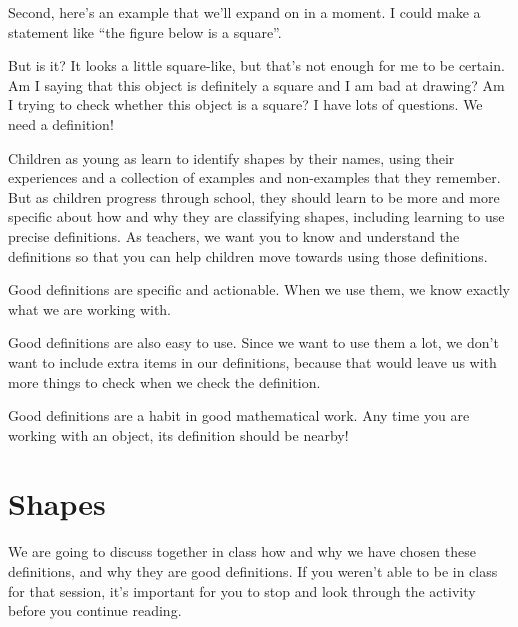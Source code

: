 \documentclass{ximera}
\begin{document}
Second, here's an example that we'll expand on in a moment. I could make a statement like ``the figure below is a square''.
\begin{image}
\end{image}
But is it? It looks a little square-like, but that's not enough for me to be certain. Am I saying that this object is definitely a square and I am bad at drawing? Am I trying to check whether this object is a square? I have lots of questions. We need a definition!

Children as young as  learn to identify shapes by their names, using their experiences and a collection of examples and non-examples that they remember. But as children progress through school, they should learn to be more and more specific about how and why they are classifying shapes, including learning to use precise definitions. As teachers, we want you to know and understand the definitions so that you can help children move towards using those definitions.

Good definitions are specific and actionable. When we use them, we know exactly what we are working with.

Good definitions are also easy to use. Since we want to use them a lot, we don't want to include extra items in our definitions, because that would leave us with more things to check when we check the definition.

Good definitions are a habit in good mathematical work. Any time you are working with an object, its definition should be nearby!



\section{Shapes}
We are going to discuss together in class how and why we have chosen these definitions, and why they are good definitions. If you weren't able to be in class for that session, it's important for you to stop and look through the  activity before you continue reading.
\end{document}
